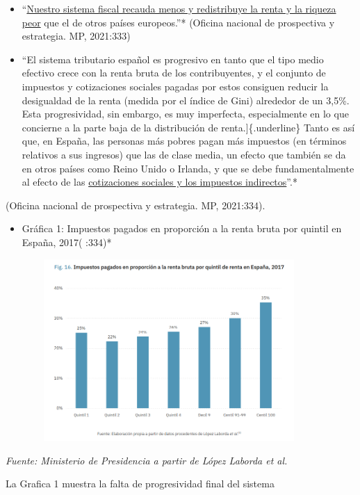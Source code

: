 \documentclass[
]{article}
\providecommand{\tightlist}{%
  \setlength{\itemsep}{0pt}\setlength{\parskip}{0pt}}
\begin{document}
\begin{itemize}
\item
  ``\ul{Nuestro sistema fiscal recauda menos y redistribuye la renta y
  la riqueza peor} que el de otros países europeos.''* (Oficina nacional
  de prospectiva y estrategia. MP, 2021:333)
\item
  ``El sistema tributario español es progresivo en tanto que el tipo
  medio efectivo crece con la renta bruta de los contribuyentes, y el
  conjunto de impuestos y cotizaciones sociales pagadas por estos
  consiguen reducir la desigualdad de la renta (medida por el índice de
  Gini) alrededor de un 3,5\%. Esta progresividad, sin embargo, es muy
  imperfecta, especialmente en lo que concierne a la parte baja de la
  distribución de renta.{]}\{.underline\} Tanto es así que, en España,
  las personas más pobres pagan más impuestos (en términos relativos a
  sus ingresos) que las de clase media, un efecto que también se da en
  otros países como Reino Unido o Irlanda, y que se debe
  fundamentalmente al efecto de las \ul{cotizaciones sociales y los
  impuestos indirectos}''.*
\end{itemize}

(Oficina nacional de prospectiva y estrategia. MP, 2021:334).

\begin{itemize}
\tightlist
\item
  Gráfica 1: Impuestos pagados en proporción a la renta bruta por
  quintil en España, 2017( :334)*
\end{itemize}

\includegraphics[width=4.89861in,height=2.72639in]{png/image1.png}

\emph{Fuente: Ministerio de Presidencia a partir de López Laborda et
al.}

La Grafica 1 muestra la falta de progresividad final del sistema
\end{document}
